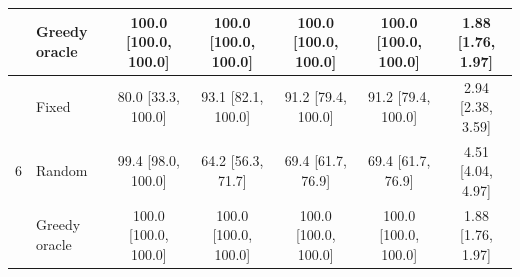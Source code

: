 \begin{table}[t]
\begin{tabular}{@{}clccccc@{}}
     & Greedy oracle & 100.0 [100.0, 100.0] & 100.0 [100.0, 100.0] & 100.0 [100.0, 100.0] & 100.0 [100.0, 100.0] & 1.88 [1.76, 1.97] \\
    \midrule
    \multirow{3}{*}{6} & Fixed & 80.0 [33.3, 100.0] & 93.1 [82.1, 100.0] & 91.2 [79.4, 100.0] & 91.2 [79.4, 100.0] & 2.94 [2.38, 3.59] \\
     & Random & 99.4 [98.0, 100.0] & 64.2 [56.3, 71.7] & 69.4 [61.7, 76.9] & 69.4 [61.7, 76.9] & 4.51 [4.04, 4.97] \\
     & Greedy oracle & 100.0 [100.0, 100.0] & 100.0 [100.0, 100.0] & 100.0 [100.0, 100.0] & 100.0 [100.0, 100.0] & 1.88 [1.76, 1.97] \\
    \bottomrule
  \end{tabular}
\end{table}
